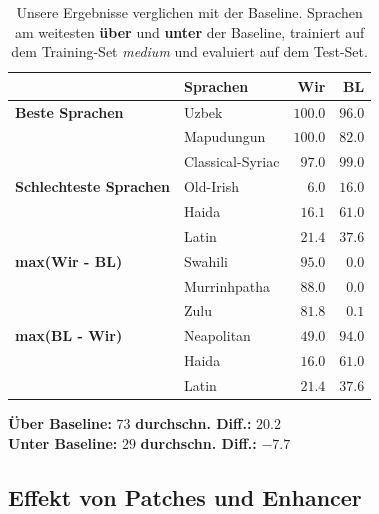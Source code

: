 \documentclass[a4paper]{article}
\begin{document}
\begin{table}
\centering
\small
\begin{tabular}{llrr}
  \toprule
                           & \textbf{Sprachen}  &\textbf{Wir} & \textbf{BL} \\
\midrule\textbf{Beste Sprachen}   & Uzbek              & $100.0$      & $96.0$ \\
                           & Mapudungun         & $100.0$      & $82.0$ \\
                           & Classical-Syriac   & $97.0$       & $99.0$ \\
\textbf{Schlechteste Sprachen}         & Old-Irish          & $6.0$        & $16.0$ \\
                           & Haida              & $16.1$       & $61.0$ \\
                           & Latin              & $21.4$       & $37.6$ \\
\midrule
\textbf{max(Wir - BL)}    & Swahili            & $95.0$         & $0.0$ \\
                           & Murrinhpatha       & $88.0$       & $0.0$ \\
                           & Zulu               & $81.8$       & $0.1$ \\
\textbf{max(BL - Wir)}    & Neapolitan         & $49.0$       & $94.0$ \\
                           & Haida              & $16.0$       & $61.0$ \\
                           & Latin              & $21.4$       & $37.6$ \\
\bottomrule
\end{tabular}

\vspace{1ex}
\textbf{Über Baseline:} $73$  \quad \textbf{durchschn. Diff.:} $20.2$\\
\textbf{Unter Baseline:} $29$ \quad \textbf{durchschn. Diff.:} $-7.7$
\caption{Unsere Ergebnisse verglichen mit der Baseline. Sprachen am weitesten \textbf{über} und \textbf{unter} der Baseline, trainiert auf dem Training-Set \textit{medium} und evaluiert auf dem Test-Set.}
\label{tab:langs_baseline}
\end{table}


\subsection{Effekt von Patches und Enhancer}
\end{document}
